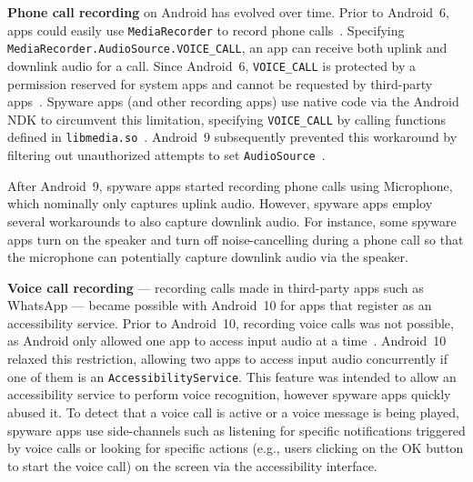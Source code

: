 \textbf{Phone call recording} on Android has evolved over time.
%
Prior to Android~6, apps could easily use \texttt{MediaRecorder} to
record phone calls~\cite{MediaRec53:online}.
Specifying \texttt{MediaRecorder.AudioSource.VOICE\_CALL},
an app can receive both uplink and downlink audio
for a call. Since Android~6, \texttt{VOICE\_CALL} is protected by a permission
reserved for system apps and cannot be requested by third-party
apps~\cite{VOICECAL55:online}. Spyware apps (and other recording apps) use
native code via the Android NDK to circumvent this limitation, specifying
\texttt{VOICE\_CALL} by calling functions defined in
\texttt{libmedia.so}~\cite{ViktorDe77:online}.
Android~9 subsequently prevented this workaround by filtering out
unauthorized attempts to set \texttt{AudioSource}~\cite{coplukAC3:online,
  services10:online}.

After Android~9, spyware apps started recording phone calls using
Microphone, which nominally only captures uplink audio.  However, spyware apps
employ several workarounds to also capture downlink audio.  For instance, some
spyware apps turn on the speaker and turn off noise-cancelling during a phone
call so that the microphone can potentially capture downlink audio via the
speaker.


\textbf{Voice call recording} --- recording calls made in third-party apps such as WhatsApp --- became possible with
Android~10 for apps that register as an accessibility service.
Prior to Android~10,
recording voice calls was not possible, as Android only allowed one app to
access input audio at a time~\cite{Sharinga60:online}.  Android~10 relaxed this
restriction, allowing two apps to access input audio concurrently if one of them
is an \texttt{AccessibilityService}.  This feature was intended to allow an
accessibility service to perform voice recognition, however spyware apps quickly
abused it.  To detect that a voice call is active or a voice message is being
played, spyware apps use side-channels such as listening for specific
notifications triggered by voice calls or looking for specific actions (e.g.,
users clicking on the OK button to start the voice call) on the screen via
the accessibility interface.


